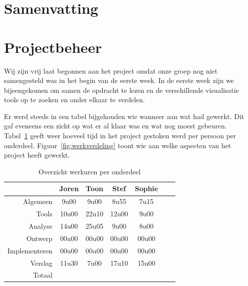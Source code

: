 \documentclass[i1]{oss}
\begin{document}
\section{Samenvatting}

\section{Projectbeheer}

Wij zijn vrij laat begonnen aan het project omdat onze groep nog niet samengesteld was in het begin van de eerste week. In de eerste week zijn we bijeengekomen om samen de opdracht te lezen en de verschillende visualisatie tools op te zoeken en onder elkaar te verdelen. 

Er werd steeds in een tabel bijgehouden wie wanneer aan wat had gewerkt. Dit gaf eveneens een zicht op wat er al klaar was en wat nog moest gebeuren. \\
Tabel~\ref{tab:werkuren} geeft weer hoeveel tijd in het project gestoken werd per persoon per onderdeel. Figuur~\ref{fig:werkverdeling} toont wie aan welke aspecten van het project heeft gewerkt.

\begin{table}[h]
\begin{center}
    \begin{tabular}{ r | c  c  c  c  c  c}
     & Joren & Toon & Stef & Sophie \\ \hline
    Algemeen & 9u00 & 9u00 & 8u55 & 7u15\\
   	Tools & 10u00 & 22u10 & 12u00 & 9u00 \\
	Analyse & 14u00 & 25u05 & 9u00 & 8u00 \\
	Ontwerp & 00u00 & 00u00 & 00u00 & 00u00 \\
	Implementeren & 00u00 & 00u00 & 00u00 & 00u00\\
	Verslag & 11u30 & 7u00 & 17u10 & 15u00 \\
	Totaal & & & & 
    \end{tabular}
    \caption{Overzicht werkuren per onderdeel}
    \label{tab:werkuren}
\end{center}
\end{table}
\end{document}
